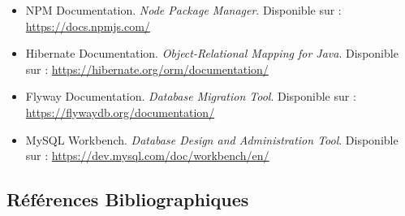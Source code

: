 \documentclass[12pt,a4paper]{report}
\begin{document}
\begin{itemize}
    \item NPM Documentation. \textit{Node Package Manager}. Disponible sur : \url{https://docs.npmjs.com/}
    
    \item Hibernate Documentation. \textit{Object-Relational Mapping for Java}. Disponible sur : \url{https://hibernate.org/orm/documentation/}
    
    \item Flyway Documentation. \textit{Database Migration Tool}. Disponible sur : \url{https://flywaydb.org/documentation/}
    
    \item MySQL Workbench. \textit{Database Design and Administration Tool}. Disponible sur : \url{https://dev.mysql.com/doc/workbench/en/}
    
\end{itemize}

\subsection{Références Bibliographiques}
\end{document}

